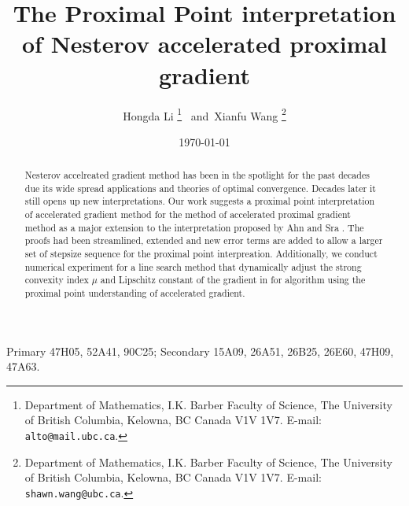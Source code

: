 \documentclass[12pt]{article}
\begin{document}
\title{{\selectfont The Proximal Point interpretation of Nesterov accelerated proximal gradient}}

\author{
    Hongda Li
    \thanks{Department of Mathematics, I.K. Barber Faculty of Science,
    The University of British Columbia, Kelowna, BC Canada V1V 1V7. E-mail:  \texttt{alto@mail.ubc.ca}.}~ and~Xianfu Wang
    \thanks{Department of Mathematics, I.K. Barber Faculty of Science,
    The University of British Columbia, Kelowna, BC Canada V1V 1V7. E-mail:  \texttt{shawn.wang@ubc.ca}.}
}

\date{\today}

\maketitle


\begin{abstract} 
    \noindent
    Nesterov accelreated gradient method has been in the spotlight for the past decades due its wide spread applications and theories of optimal convergence. 
    Decades later it still opens up new interpretations. 
    Our work suggests a proximal point interpretation of accelerated gradient method for the method of accelerated proximal gradient method as a major extension to the interpretation proposed by Ahn and Sra \cite{ahn_understanding_2022}. 
    The proofs had been streamlined, extended and new error terms are added to allow a larger set of stepsize sequence for the proximal point interpreation. 
    Additionally, we conduct numerical experiment for a line search method that dynamically adjust the strong convexity index $\mu$ and Lipschitz constant of the gradient in for algorithm  using the proximal point understanding of accelerated gradient. 
    
\end{abstract}

Primary 47H05, 52A41, 90C25; Secondary 15A09, 26A51, 26B25, 26E60, 47H09, 47A63.
\end{document}
